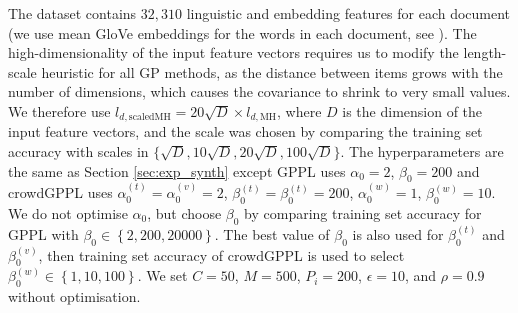 The dataset contains $32,310$ linguistic and embedding features
for each document (we use mean GloVe embeddings for the words in each document, see \citet{simpson2018finding}). The high-dimensionality of the input feature vectors requires us to modify the length-scale heuristic for all GP methods,
as the distance between items grows with the number of dimensions,
which causes the covariance to shrink to very small values. We therefore use
$l_{d,\mathrm{scaledMH}} = 20\sqrt{D} \times l_{d,\mathrm{MH}}$, 
where $D$ is the dimension of the input feature vectors,
and the scale was chosen by comparing the training set accuracy 
with scales in $\{\sqrt{D}, 10\sqrt{D}, 20\sqrt{D}, 100\sqrt{D}\}$.
The hyperparameters are the same as Section \ref{sec:exp_synth} 
except GPPL uses $\alpha_0 = 2$, $\beta_0 = 200$ and
crowdGPPL uses $\alpha^{(t)}_0=\alpha^{(v)}_0=2$, $\beta^{(t)}_0=\beta^{(t)}_0=200$,
$\alpha^{(w)}_0=1$, $\beta^{(w)}_0=10$.
We do not optimise $\alpha_0$, but choose $\beta_0$ by comparing
training set accuracy for GPPL with $\beta_0 \in \left\{2,200,20000\right\}$.
The best value of $\beta_0$ is also used for $\beta^{(t)}_0$ and $\beta^{(v)}_0$, 
then training set accuracy of crowdGPPL is used to select 
$\beta^{(w)}_0 \in \left\{1, 10, 100 \right\}$.
We set $C=50$, $M=500$, $P_i=200$, $\epsilon=10$, and $\rho=0.9$ without optimisation.

